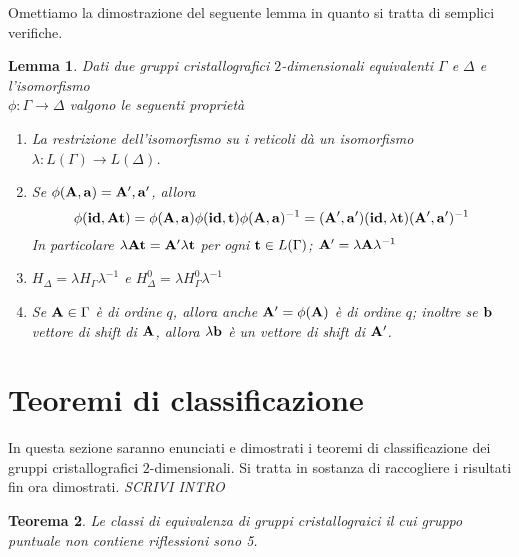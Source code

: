\documentclass[a4paper,11pt,openright,twoside	]{book}
\newtheorem{theorem}{Teorema}[section]
\newtheorem{lemma}[theorem]{Lemma}
\begin{document}
Omettiamo la dimostrazione del seguente lemma in quanto si tratta di semplici verifiche. 
\begin{lemma}
Dati due gruppi cristallografici $2$-dimensionali equivalenti $\Gamma$ e $\Delta$ e l'isomorfismo \\ $\phi : \Gamma \longrightarrow \Delta$ valgono le seguenti proprietà
\begin{enumerate}
\item La restrizione dell'isomorfismo su i reticoli dà un isomorfismo $\lambda: L(\Gamma) \longrightarrow L(\Delta)$.
\item Se $\phi(\vb{A, a}) = \vb{A', a'} $, allora 
\[ \phi(\vb{id, At}) = \phi(\vb{A,a})\phi(\vb{id, t})\phi(\vb{A,a})^{-1} =( \vb{A',a'})(\vb{id}, \lambda \vb{t})( \vb{A',a'})^{-1}\]
In particolare $\lambda \vb{At} = \vb{A}' \lambda \vb{t}$ per ogni $\vb{t} \in L(\Gamma)$; $\vb{A'} = \lambda \vb{A} \lambda^{-1}$
\item $H_{\Delta} = \lambda H_{\Gamma} \lambda^{-1}$ e $H_{\Delta}^{0} = \lambda H_{\Gamma}^{0} \lambda^{-1}$
\item Se $\vb{A} \in \Gamma$ è di ordine $q$, allora anche $\vb{A'} = \phi(\vb{A})$ è di ordine $q$; inoltre se $\vb{b}$ vettore di shift di $\vb{A}$, allora $\lambda \vb{b}$ è un vettore di shift di $\vb{A'}$. 
\end{enumerate}
\end{lemma}
\section{Teoremi di classificazione}
In questa sezione saranno enunciati e dimostrati i teoremi di classificazione dei gruppi cristallografici $2$-dimensionali. Si tratta in sostanza di raccogliere i risultati fin ora dimostrati. 
\emph{SCRIVI INTRO}

\begin{theorem}
Le classi di equivalenza di gruppi cristallograici il cui gruppo puntuale non contiene riflessioni sono 5.
\end{theorem}
\end{document}
